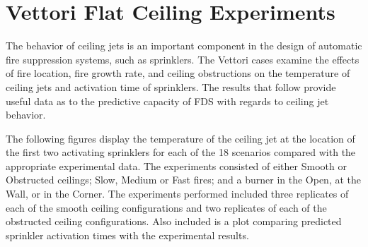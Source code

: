 \clearpage


\section{Vettori Flat Ceiling Experiments}
\label{Vettori_Flat_Results}

The behavior of ceiling jets is an important component in the design of automatic fire suppression systems, such as sprinklers. The Vettori cases examine the effects of fire location, fire growth rate, and ceiling obstructions on the temperature of ceiling jets and activation time of sprinklers. The results that follow provide useful data as to the predictive capacity of FDS with regards to ceiling jet behavior.

The following figures display the temperature of the ceiling jet at the location of the first two activating sprinklers for each of the 18 scenarios compared
with the appropriate experimental data. The
experiments consisted of either Smooth or Obstructed ceilings; Slow, Medium or Fast fires; and a burner in the Open, at the Wall, or in the Corner.
The experiments performed included three replicates of each of the smooth ceiling configurations and two replicates of each of the obstructed ceiling configurations.
Also included is a plot comparing predicted sprinkler activation times with the experimental results.

